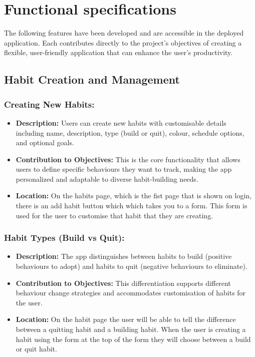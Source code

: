 \section{Functional specifications}
\label{sect:functional-specifications}
The following features have been developed and are accessible in the deployed application. Each contributes directly to the project's objectives of creating a flexible, user-friendly application that can enhance the user's productivity.

\subsection{Habit Creation and Management}
\subsubsection{Creating New Habits:}
\begin{itemize}
    \item \textbf{Description:} Users can create new habits with customisable details including name, description, type (build or quit), colour, schedule options, and optional goals.
    \item \textbf{Contribution to Objectives:} This is the core functionality that allows users to define specific behaviours they want to track, making the app personalized and adaptable to diverse habit-building needs.
    \item \textbf{Location:} On the habits page, which is the fist page that is shown on login, there is an add habit button which which takes you to a form. This form is used for the user to customise that habit that they are creating.
\end{itemize}

\subsubsection{Habit Types (Build vs Quit):}
\begin{itemize}
    \item \textbf{Description:} The app distinguishes between habits to build (positive behaviours to adopt) and habits to quit (negative behaviours to eliminate).
    \item \textbf{Contribution to Objectives:} This differentiation supports different behaviour change strategies and accommodates customisation of habits for the user.
    \item \textbf{Location:} On the habit page the user will be able to tell the difference between a quitting habit and a building habit. When the user is creating a habit using the form at the top of the form they will choose between a build or quit habit.
\end{itemize}

